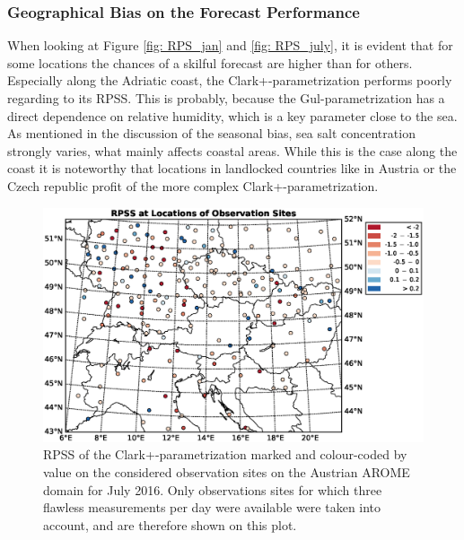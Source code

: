 \subsubsection{Geographical Bias on the Forecast Performance }
When looking at Figure \ref{fig: RPS_jan} and \ref{fig: RPS_july}, it is evident that for some locations the chances of a skilful forecast are higher than for others. Especially along the Adriatic coast, the Clark+-parametrization performs poorly regarding to its RPSS. This is probably, because the Gul-parametrization has a direct dependence on relative humidity, which is a key parameter close to the sea. As mentioned in the discussion of the seasonal bias, sea salt concentration strongly varies, what mainly affects coastal areas. While this is the case along the coast it is noteworthy that locations in landlocked countries like in Austria or the Czech republic profit of the more complex Clark+-parametrization.

\begin{figure}[h]
    \centering
    \includegraphics[width=\textwidth]{graphics/results/Rated_stations-201607.eps}
    \caption[Stations Marked with RPSS for July 2017]{RPSS of the Clark+-parametrization marked and colour-coded by value on the considered observation sites on the Austrian AROME domain for July 2016. Only observations sites for which three flawless measurements per day were available were taken into account, and are therefore shown on this plot.}
    \label{fig: Stations_july}
\end{figure}

